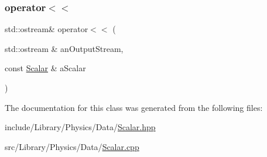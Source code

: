 \subsubsection{\texorpdfstring{operator$<$$<$}{operator<<}}
{\footnotesize\ttfamily std\+::ostream\& operator$<$$<$ (\begin{DoxyParamCaption}\item[{std\+::ostream \&}]{an\+Output\+Stream,  }\item[{const \hyperlink{classlibrary_1_1physics_1_1data_1_1_scalar}{Scalar} \&}]{a\+Scalar }\end{DoxyParamCaption})\hspace{0.3cm}{\ttfamily [friend]}}



The documentation for this class was generated from the following files\+:\begin{DoxyCompactItemize}
\item 
include/\+Library/\+Physics/\+Data/\hyperlink{_scalar_8hpp}{Scalar.\+hpp}\item 
src/\+Library/\+Physics/\+Data/\hyperlink{_scalar_8cpp}{Scalar.\+cpp}\end{DoxyCompactItemize}
